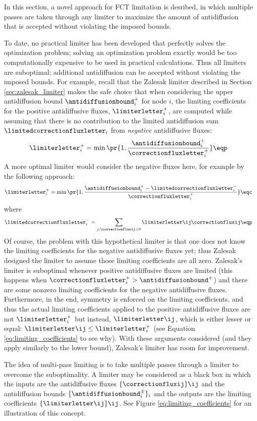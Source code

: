 In this section, a novel approach for FCT limitation is desribed, in which
multiple passes are taken through any limiter to maximize the amount of
antidiffusion that is accepted without violating the imposed bounds.

To date, no practical limiter has been developed that perfectly solves
the optimization problem; solving an optimization problem exactly would
be too computationally expensive to be used in practical calculations.
Thus all limiters are suboptimal; additional antidiffusion can be accepted
without violating the imposed bounds. For example, recall that the Zalesak
limiter described in Section \ref{sec:zalesak_limiter} makes the safe
choice that when considering the upper antidiffusion bound
$\antidiffusionbound_i^+$ for node $i$, the limiting coefficients
for the positive antidiffusive fluxes, $\limiterletter_i^+$, are computed
while assuming that there is no contribution to the limited antidiffusion sum
$\limitedcorrectionfluxletter_i$ from \emph{negative} antidiffusive fluxes:
\[
  \limiterletter_i^+ = \min\pr{1,\frac{\antidiffusionbound_i^+}
    {\correctionfluxletter_i^+}} \eqp
\]
A more optimal limiter would consider the negative fluxes here, for example
by the following approach:
\[
  \limiterletter_i^+ = \min\pr{1,\frac{\antidiffusionbound_i^+
    - \limitedcorrectionfluxletter_i^-}
    {\correctionfluxletter_i^+}} \eqc
\]
where
\[
  \limitedcorrectionfluxletter_i^- = \sum\limits_{j:\correctionfluxij<0}
    \limiterletter\ij\correctionfluxij \eqp
\]
Of course, the problem with this hypothetical limiter is that one does not
know the limiting coefficients for the negative antidiffusive fluxes yet;
thus Zalesak designed the limiter to assume those limiting coefficients
are all zero. Zalesak's limiter is suboptimal whenever
positive antidiffusive fluxes are limited
(this happens when $\correctionfluxletter_i^+ > \antidiffusionbound^+$)
and there are some nonzero limiting coefficients for the negative antidiffusive
fluxes. Furthermore, in the end, symmetry is enforced on the limiting
coefficients, and thus the actual limiting coefficients applied to the
positive antidiffusive fluxes are not $\limiterletter_i^+$ but instead,
$\limiterletter\ij$, which is either lesser or equal:
$\limiterletter\ij \leq\limiterletter_i^+$ (see Equation
\eqref{eq:limiting_coefficients} to see why). With these arguments considered
(and they apply similarly to the lower bound), Zalesak's limiter has
room for improvement.

The idea of multi-pass limiting is to take multiple passes through a
limiter to overcome the suboptimality.
A limiter may be considered as a black box in which the inputs are the
antidiffusive fluxes $\{\correctionfluxij\}\ij$ and the antidiffusion bounds
$\{\antidiffusionbound_i^\pm\}_i$ and the outputs are the limiting coefficients
$\{\limiterletter\ij\}\ij$. See Figure \ref{eq:limiting_coefficients} for
an illustration of this concept.

